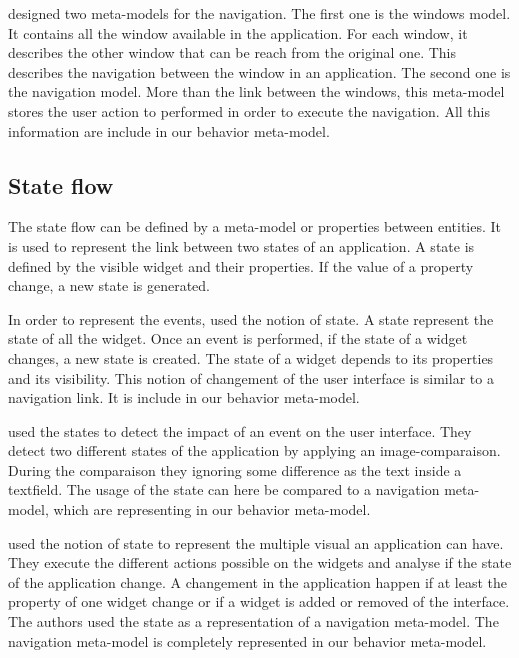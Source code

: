 \documentclass[conference]{IEEEtran}
\begin{document}
\citet{morgado2011reverse} designed two meta-models for the navigation.
The first one is the windows model.
It contains all the window available in the application.
For each window, it describes the other window that can be reach from the original one.
This describes the navigation between the window in an application.
The second one is the navigation model.
More than the link between the windows,
    this meta-model stores the user action to performed in order to execute the navigation.
All this information are include in our behavior meta-model.

\subsection{State flow}
\label{sec:state}

The state flow can be defined by a meta-model or properties between entities.
It is used to represent the link between two states of an application.
A state is defined by the visible widget and their properties.
If the value of a property change, a new state is generated.

In order to represent the events, 
    \citet{memon2007eventflow} used the notion of state.
A state represent the state of all the widget.
Once an event is performed,
    if the state of a widget changes, a new state is created.
The state of a widget depends to its properties and its visibility.
This notion of changement of the user interface is similar to a navigation link.
It is include in our behavior meta-model.

\citet{joorabchi2012reverse} used the states to detect the impact
    of an event on the user interface.
They detect two different states of the application by applying an image-comparaison.
During the comparaison they ignoring some difference as the text inside a textfield.
The usage of the state can here be compared to a navigation meta-model,
    which are representing in our behavior meta-model.

\citet{mesbah2012crawling} used the notion of state to represent the multiple
    visual an application can have.
They execute the different actions possible on the widgets and analyse if the state of the application change.
A changement in the application happen if at least the property of one widget change or if a widget is added or removed of the interface.
The authors used the state as a representation of a navigation meta-model.
The navigation meta-model is completely represented in our behavior meta-model.
\end{document}
